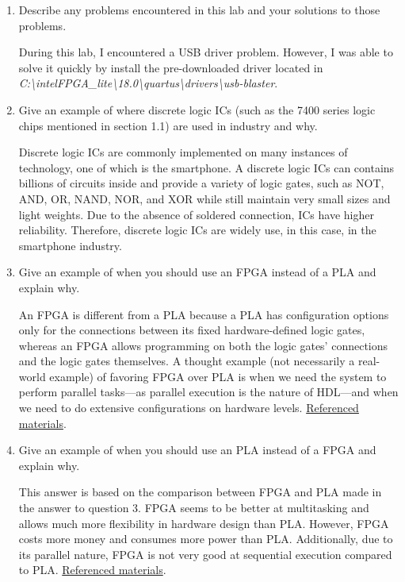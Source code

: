 \documentclass[12pt]{article}
\begin{document}
\begin{enumerate}
  \item Describe any problems encountered in this lab and your solutions to those problems.

  During this lab, I encountered a USB driver problem. However, I was able to solve it quickly by install the pre-downloaded driver located in \textit{C:\textbackslash{}intelFPGA\_lite\textbackslash{}18.0\textbackslash{}quartus\textbackslash{}drivers\textbackslash{}usb-blaster}.

  \item Give an example of where discrete logic ICs (such as the 7400 series logic chips mentioned in section 1.1) are used in industry and why.

  Discrete logic ICs are commonly implemented on many instances of technology, one of which is the smartphone. A discrete logic ICs can contains billions of circuits inside and provide a variety of logic gates, such as NOT, AND, OR, NAND, NOR, and XOR while still maintain very small sizes and light weights. Due to the absence of soldered connection, ICs have higher reliability. Therefore, discrete logic ICs are widely use, in this case, in the smartphone industry.

  \item Give an example of when you should use an FPGA instead of a PLA and explain why.

  An FPGA is different from a PLA because a PLA has configuration options only for the connections between its fixed hardware-defined logic gates, whereas an FPGA allows programming on both the logic gates' connections and the logic gates themselves. A thought example (not necessarily a real-world example) of favoring FPGA over PLA is when we need the system to perform parallel tasks---as parallel execution is the nature of HDL---and when we need to do extensive configurations on hardware levels. \href{https://electronics.stackexchange.com/a/4393/97402}{Referenced materials}.

  \item Give an example of when you should use an PLA instead of a FPGA and explain why.

  This answer is based on the comparison between FPGA and PLA made in the answer to question 3. FPGA seems to be better at multitasking and allows much more flexibility in hardware design than PLA. However, FPGA costs more money and consumes more power than PLA. Additionally, due to its parallel nature, FPGA is not very good at sequential execution compared to PLA. \href{https://www.viewpointusa.com/industrial-embedded/when-is-an-fpga-worth-it-and-when-is-it-not-when-developing-an-industrial-embedded-system/}{Referenced materials}.


\end{enumerate}
\end{document}
